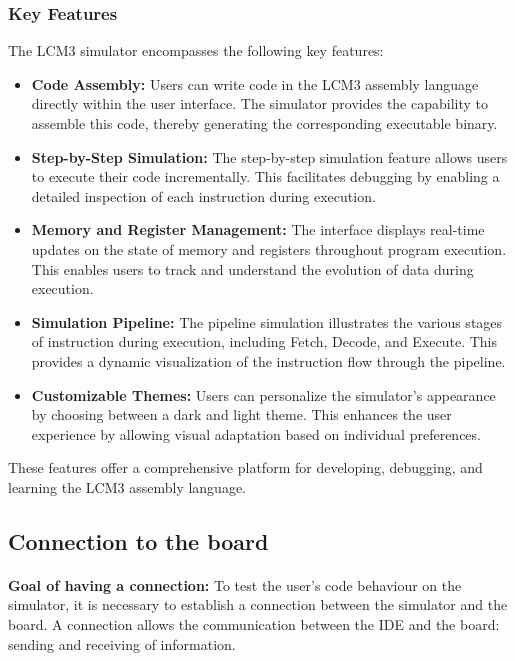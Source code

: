 \documentclass{article}
\begin{document}
\subsubsection{Key Features}
The LCM3 simulator encompasses the following key features:
\begin{itemize}
    \item \textbf{Code Assembly:} Users can write code in the LCM3 assembly language directly within the user interface. The simulator provides the capability to assemble this code, thereby generating the corresponding executable binary.

  \item \textbf{Step-by-Step Simulation:} The step-by-step simulation feature allows users to execute their code incrementally. This facilitates debugging by enabling a detailed inspection of each instruction during execution.

  \item \textbf{Memory and Register Management:} The interface displays real-time updates on the state of memory and registers throughout program execution. This enables users to track and understand the evolution of data during execution.

  \item \textbf{Simulation Pipeline:} The pipeline simulation illustrates the various stages of instruction during execution, including Fetch, Decode, and Execute. This provides a dynamic visualization of the instruction flow through the pipeline.

  \item \textbf{Customizable Themes:} Users can personalize the simulator's appearance by choosing between a dark and light theme. This enhances the user experience by allowing visual adaptation based on individual preferences.
\end{itemize}
These features offer a comprehensive platform for developing, debugging, and learning the LCM3 assembly language.




\newpage
\subsection{Connection to the board}
\paragraph{}\textbf{Goal of having a connection:} To test the user's code behaviour on the simulator, it is necessary to establish a connection between the simulator and the board. A connection allows the communication between the IDE and the board: sending and receiving of information.
\end{document}

